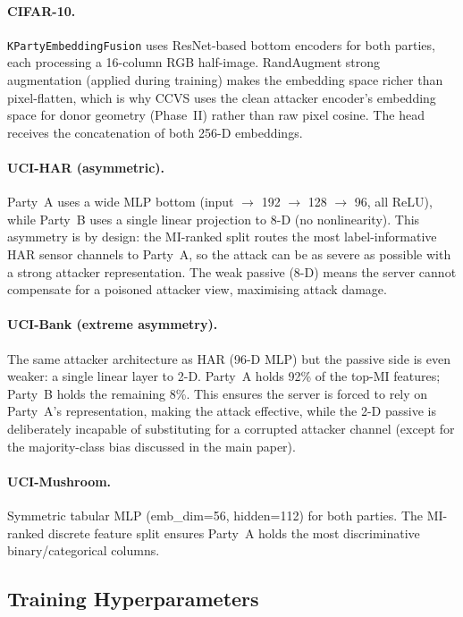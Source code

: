 \documentclass{article}
\begin{document}
\paragraph{CIFAR-10.}
\texttt{KPartyEmbeddingFusion} uses ResNet-based bottom encoders for both
parties, each processing a 16-column RGB half-image.
RandAugment strong augmentation (applied during training) makes the embedding
space richer than pixel-flatten, which is why CCVS uses the clean attacker
encoder's embedding space for donor geometry (Phase~II) rather than raw
pixel cosine.
The head receives the concatenation of both 256-D embeddings.

\paragraph{UCI-HAR (asymmetric).}
Party~A uses a wide MLP bottom (input $\to$ 192 $\to$ 128 $\to$ 96, all ReLU),
while Party~B uses a single linear projection to 8-D (no nonlinearity).
This asymmetry is by design: the MI-ranked split routes the most label-informative
HAR sensor channels to Party~A, so the attack can be as severe as possible
with a strong attacker representation.
The weak passive (8-D) means the server cannot compensate for a poisoned
attacker view, maximising attack damage.

\paragraph{UCI-Bank (extreme asymmetry).}
The same attacker architecture as HAR (96-D MLP) but the passive side is
even weaker: a single linear layer to 2-D.
Party~A holds 92\% of the top-MI features; Party~B holds the remaining 8\%.
This ensures the server is forced to rely on Party~A's representation,
making the attack effective, while the 2-D passive is deliberately incapable
of substituting for a corrupted attacker channel (except for the majority-class
bias discussed in the main paper).

\paragraph{UCI-Mushroom.}
Symmetric tabular MLP (emb\_dim=56, hidden=112) for both parties.
The MI-ranked discrete feature split ensures Party~A holds the most
discriminative binary/categorical columns.

\subsection{Training Hyperparameters}
\end{document}
